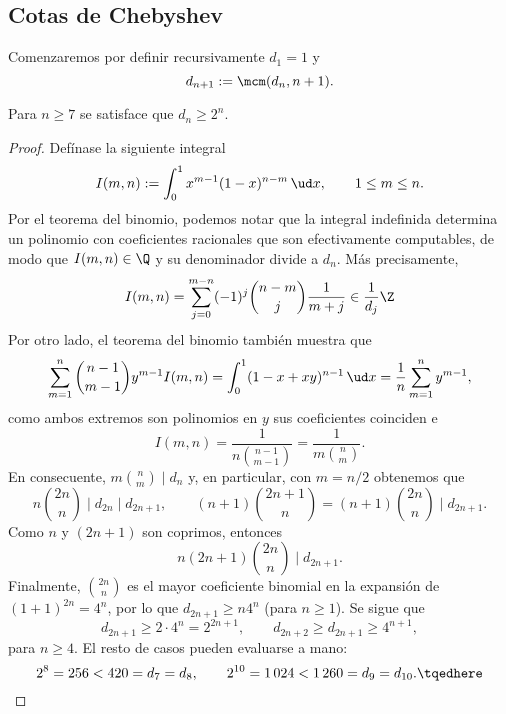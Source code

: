 \documentclass[teoria-numeros.tex]{subfiles}
\begin{document}
\subsection{Cotas de Chebyshev}
Comenzaremos por definir recursivamente $d_1 = 1$ y
$$ d_{n+1} := \mcm(d_n, n+1). $$
\begin{thm}[Nair]
	Para $n \ge 7$ se satisface que $d_n \ge 2^n$.
\end{thm}
\begin{proof}
	Defínase la siguiente integral
	$$ I(m, n) := \int_{0}^{1} x^{m-1}(1 - x)^{n-m} \, \ud x, \qquad 1 \le m \le n. $$
	Por el teorema del binomio, podemos notar que la integral indefinida determina un polinomio con coeficientes racionales
	que son efectivamente computables, de modo que $I(m, n) \in \Q$ y su denominador divide a $d_n$.
	Más precisamente,
	$$ I(m, n) = \sum_{j=0}^{m-n} (-1)^j \binom{n-m}{j} \frac{1}{m + j} \in \frac{1}{d_j}\Z $$
	Por otro lado, el teorema del binomio también muestra que
	$$ \sum_{m=1}^{n} \binom{n-1}{m-1} y^{m-1} I(m, n) = \int_{0}^{1} (1 - x + xy)^{n-1} \, \ud x = \frac{1}{n} \sum_{m=1}^{n} y^{m-1}, $$
	como ambos extremos son polinomios en $y$ sus coeficientes coinciden e
	$$ I(m, n) = \frac{1}{n \binom{n-1}{m-1}} = \frac{1}{m \binom{n}{m}}. $$
	En consecuente, $m \binom{n}{m} \mid d_n$ y, en particular, con $m = n/2$ obtenemos que
	$$ n \binom{2n}{n} \mid d_{2n} \mid d_{2n+1}, \qquad (n+1) \binom{2n+1}{n} = (n+1) \binom{2n}{n} \mid d_{2n+1}. $$
	Como $n$ y $(2n+1)$ son coprimos, entonces
	$$ n(2n+1) \binom{2n}{n} \mid d_{2n+1}. $$
	Finalmente, $\binom{2n}{n}$ es el mayor coeficiente binomial en la expansión de $(1 + 1)^{2n} = 4^n$, por lo que $d_{2n+1} \ge n 4^n$
	(para $n \ge 1$).
	Se sigue que
	$$ d_{2n+1} \ge 2\cdot 4^n = 2^{2n+1}, \qquad d_{2n+2} \ge d_{2n+1} \ge 4^{n+1}, $$
	para $n \ge 4$.
	El resto de casos pueden evaluarse a mano:
	\begin{equation*}
		2^8 = 256 < 420 = d_7 = d_8, \qquad 2^{10} = 1\,024 < 1\,260 = d_9 = d_{10}.
		\tqedhere
	\end{equation*}
\end{proof}
\end{document}
